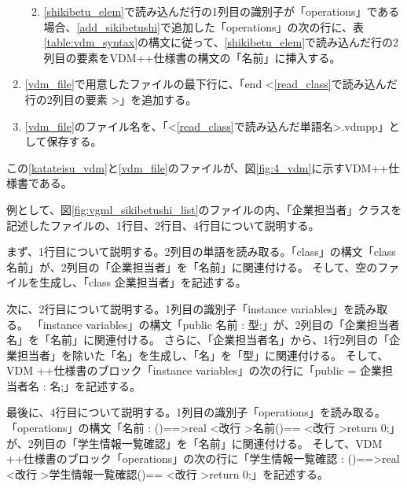 \begin{enumerate}
\begin{enumerate}
\begin{enumerate}
                \end{enumerate}
            \item \ref{shikibetu_elem}で読み込んだ行の1列目の識別子が「operations」である場合、\ref{add_sikibetushi}で追加した「operations」の次の行に、表{\ref{table:vdm_syntax}}の構文に従って、\ref{shikibetu_elem}で読み込んだ行の2列目の要素をVDM++仕様書の構文の「名前」に挿入する。
        \end{enumerate}
    \item \ref{vdm_file}で用意したファイルの最下行に、「end \textless \ref{read_class}で読み込んだ行の2列目の要素 \textgreater」を追加する。
    \item \ref{vdm_file}のファイル名を、「\textless \ref{read_class}で読み込んだ単語名\textgreater.vdmpp」として保存する。
\end{enumerate}

この\ref{katateisu_vdm}と\ref{vdm_file}のファイルが、図\ref{fig:4_vdm}に示すVDM++仕様書である。

例として、図\ref{fig:vgml_sikibetushi_list}のファイルの内、「企業担当者」クラスを記述したファイルの、1行目、2行目、4行目について説明する。

まず、1行目について説明する。2列目の単語を読み取る。「class」の構文「class 名前」が、2列目の「企業担当者」を「名前」に関連付ける。
そして、空のファイルを生成し、「class 企業担当者」を記述する。

次に、2行目について説明する。1列目の識別子「instance variables」を読み取る。
「instance variables」の構文「public 名前 : 型;」が、2列目の「企業担当者名」を「名前」に関連付ける。
さらに、「企業担当者名」から、1行2列目の「企業担当者」を除いた「名」を生成し、「名」を「型」に関連付ける。
そして、VDM ++仕様書のブロック「instance variables」の次の行に「public  = 企業担当者名 : 名;」を記述する。

最後に、4行目について説明する。1列目の識別子「operations」を読み取る。
「operations」の構文「名前 : ()==\textgreater real \textless 改行 \textgreater 名前()== \textless 改行 \textgreater return 0;」が、2列目の「学生情報一覧確認」を「名前」に関連付ける。
そして、VDM ++仕様書のブロック「operations」の次の行に「学生情報一覧確認 : ()==\textgreater real \textless 改行 \textgreater 学生情報一覧確認()== \textless 改行 \textgreater return 0;」を記述する。

